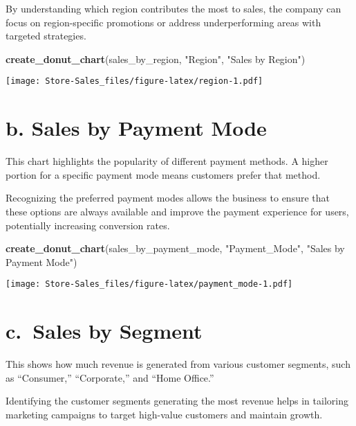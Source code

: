 \documentclass[
]{article}
\newenvironment{Shaded}{\begin{snugshade}}{\end{snugshade}}
\newcommand{\FunctionTok}[1]{\textcolor[rgb]{0.13,0.29,0.53}{\textbf{#1}}}
\newcommand{\NormalTok}[1]{#1}
\newcommand{\StringTok}[1]{\textcolor[rgb]{0.31,0.60,0.02}{#1}}
\begin{document}
By understanding which region contributes the most to sales, the company
can focus on region-specific promotions or address underperforming areas
with targeted strategies.

\begin{Shaded}
\begin{Highlighting}[]
\FunctionTok{create\_donut\_chart}\NormalTok{(sales\_by\_region, }\StringTok{"Region"}\NormalTok{, }\StringTok{"Sales by Region"}\NormalTok{)}
\end{Highlighting}
\end{Shaded}

\texttt{[image: Store-Sales\_files/figure-latex/region-1.pdf]}

\hypertarget{b.-sales-by-payment-mode}{%
\section{b. Sales by Payment Mode}\label{b.-sales-by-payment-mode}}

This chart highlights the popularity of different payment methods. A
higher portion for a specific payment mode means customers prefer that
method.

Recognizing the preferred payment modes allows the business to ensure
that these options are always available and improve the payment
experience for users, potentially increasing conversion rates.

\begin{Shaded}
\begin{Highlighting}[]
\FunctionTok{create\_donut\_chart}\NormalTok{(sales\_by\_payment\_mode, }\StringTok{"Payment\_Mode"}\NormalTok{, }\StringTok{"Sales by Payment Mode"}\NormalTok{)}
\end{Highlighting}
\end{Shaded}

\texttt{[image: Store-Sales\_files/figure-latex/payment\_mode-1.pdf]}

\hypertarget{c.-sales-by-segment}{%
\section{c.~Sales by Segment}\label{c.-sales-by-segment}}

This shows how much revenue is generated from various customer segments,
such as ``Consumer,'' ``Corporate,'' and ``Home Office.''

Identifying the customer segments generating the most revenue helps in
tailoring marketing campaigns to target high-value customers and
maintain growth.
\end{document}

